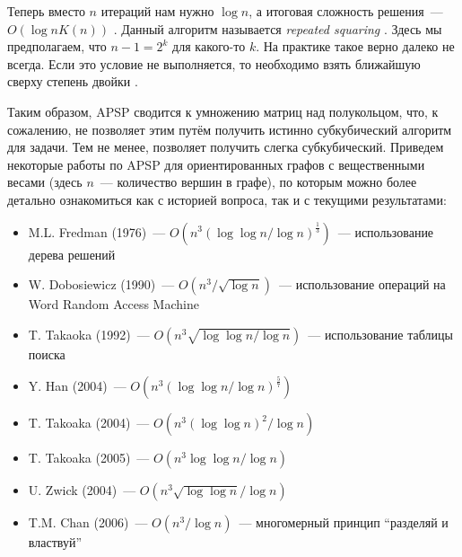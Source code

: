 Теперь вместо $n$ итераций нам нужно $\log{n}$, а итоговая сложность решения~--- $O(\log{n} K(n))$%
.
Данный алгоритм называется \emph{repeated squaring}%
.
Здесь мы предполагаем, что $n-1 = 2^k$ для какого-то $k$.
На практике такое верно далеко не всегда.
Если это условие не выполняется, то необходимо взять ближайшую сверху степень двойки%
.

Таким образом, APSP сводится к умножению матриц над полукольцом, что, к сожалению, не позволяет этим путём получить истинно субкубический алгоритм для задачи.
Тем не менее, позволяет получить слегка субкубический.
Приведем некоторые работы по APSP для ориентированных графов с вещественными весами (здесь $n$~--- количество вершин в графе), по которым можно более детально ознакомиться как с историей вопроса, так и с текущими результатами:
\begin{itemize}
    \item M.L. Fredman (1976)~--- $O(n^3(\log \log n / \log n)^\frac{1}{3})$~--- использование дерева решений~
    \item W. Dobosiewicz (1990)~--- $O(n^3 / \sqrt{\log n})$~--- использование операций на Word Random Access Machine~
    \item T. Takaoka (1992)~--- $O(n^3 \sqrt{\log \log n / \log n})$~--- использование таблицы поиска~
    \item Y. Han (2004)~--- $O(n^3 (\log \log n / \log n)^\frac{5}{7})$~
    \item T. Takoaka (2004)~--- $O(n^3 (\log \log n)^2 / \log n)$~
    \item T. Takoaka (2005)~--- $O(n^3 \log \log n / \log n)$~
    \item U. Zwick (2004)~--- $O(n^3 \sqrt{\log \log n} / \log n)$~
    \item T.M. Chan (2006)~--- $O(n^3 / \log n)$~--- многомерный принцип \enquote{разделяй и властвуй}~
\end{itemize}

